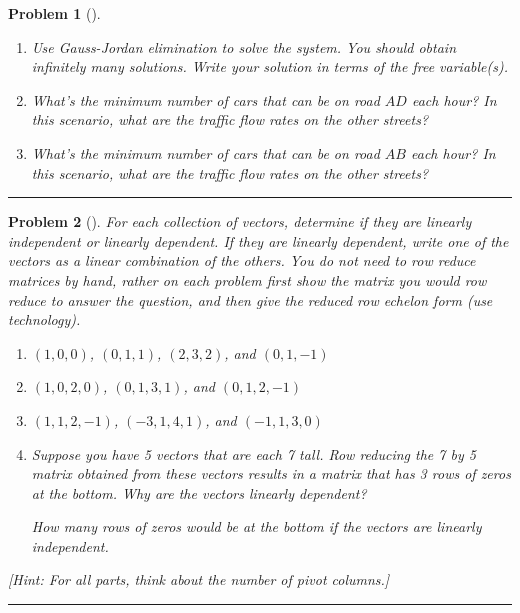 \documentclass[letterpaper,oneside]{book}%
\theoremstyle{plain}
\theoremstyle{box}
\theoremstyle{problem}
\newtheorem{problemnum}{Problem}[chapter]
\newenvironment{problem}[1][]{\begin{problemnum}[#1]}{\end{problemnum}\nopagebreak\hrule\bigskip}
\begin{document}
\begin{problem}
\begin{enumerate}
 \item Use Gauss-Jordan elimination to solve the system. You should obtain infinitely many solutions. Write your solution in terms of the free variable(s).
 \item What's the minimum number of cars that can be on road $AD$ each hour? In this scenario, what are the traffic flow rates on the other streets? 
 \item What's the minimum number of cars that can be on road $AB$ each hour? In this scenario, what are the traffic flow rates on the other streets?
\end{enumerate}
\end{problem}




\begin{problem}
For each collection of vectors, determine if they are linearly independent or linearly dependent.  If they are linearly dependent, write one of the vectors as a linear combination of the others. You do not need to row reduce matrices by hand, rather on each problem first show the matrix you would row reduce to answer the question, and then give the reduced row echelon form (use technology).
\begin{enumerate}
 \item $(1,0,0)$, $(0,1,1)$, $(2,3,2)$, and $(0,1,-1)$ 
 \item $(1,0,2,0)$, $(0,1,3,1)$, and $(0,1,2,-1)$
 \item $(1,1,2,-1)$, $(-3,1,4,1)$, and $(-1,1,3,0)$
 \item Suppose you have 5 vectors that are each 7 tall. Row reducing the 7 by 5 matrix obtained from these vectors results in a matrix that has 3 rows of zeros at the bottom.  Why are the vectors linearly dependent?

 How many rows of zeros would be at the bottom if the vectors are linearly independent. 
\end{enumerate}
[Hint: For all parts, think about the number of pivot columns.]
\end{problem}
\end{document}
